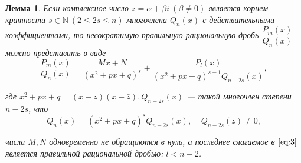 \documentclass[12pt]{report}
\numberwithin{equation}{section}
\newtheorem{lemma}{Лемма}[section]
\begin{document}
\begin{lemma} \label{lemm:1:2}
Если комплексное число $z = \alpha + \beta i~(\beta \neq 0)$ является корнем кратности $s \in \mathbb{N}~(2 \leqslant 2s \leqslant n) $ многочлена $Q_n(x)$ с действительными коэффициентами, то несократимую правильную рациональную дробь $\dfrac{P_m(x)}{Q_n(x)}$ можно представить в виде
\begin{equation}
\frac{P_m(x)}{Q_n(x)} = \frac{Mx + N}{(x^2 + px + q)^s} + \frac{P_l(x)}{(x^2 + px + q)^{s-1} Q_{n-2s}(x)}, \label{eq:3}
\end{equation}

где $x^2 + px + q = (x-z)(x-\bar{z}), Q_{n-2s}(x)$ --- такой многочлен степени $n- 2s$, что
\[ Q_n(x) = (x^2 + px + q)^s Q_{n-2s}(x),~~~~~Q_{n-2s}(z) \neq 0, \]

числа $M, N$ одновременно не обращаются в нуль, а последнее слагаемое в $\eqref{eq:3}$ является правильной рациональной дробью: $l < n - 2$.
\end{lemma}
\end{document}
